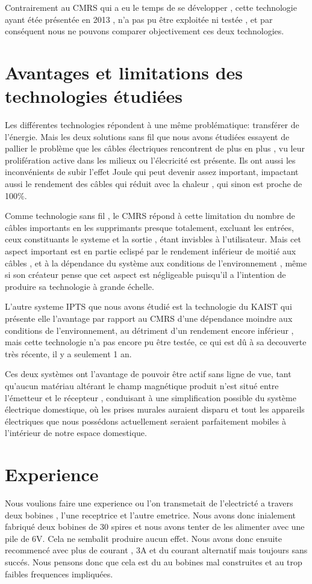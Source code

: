 \documentclass[12pt]{report}
\begin{document}
  Contrairement au CMRS qui a eu le temps de se développer , cette technologie ayant étée présentée en 2013 , n'a pas pu être exploitée ni testée , et par conséquent nous ne pouvons comparer objectivement ces deux technologies.
\section{Avantages et limitations des technologies étudiées}
  Les différentes technologies répondent à une même problématique: transférer de l'énergie. Mais les deux solutions sans fil que nous avons étudiées essayent de pallier le problème que les câbles électriques rencontrent de plus en plus , vu leur prolifération active dans les milieux ou l'élecricité est présente. Ils ont aussi les inconvénients de subir l'effet Joule qui peut devenir assez important, impactant aussi le rendement des câbles qui réduit avec la chaleur , qui sinon est proche de 100\%.

  Comme technologie sans fil , le CMRS répond à cette limitation du nombre de câbles importants en les supprimants presque totalement, excluant les entrées, ceux constituants le systeme et la sortie , étant invisbles à l'utilisateur. Mais cet aspect important est en partie eclispé par le rendement inférieur de moitié aux câbles , et à la dépendance du système aux conditions de l'environnement , même si son créateur pense que cet aspect est négligeable puisqu'il a l'intention de produire sa technologie à grande échelle.
  
  L'autre systeme IPTS que nous avons étudié est la technologie du KAIST qui présente elle l'avantage par rapport au CMRS d'une dépendance moindre aux conditions de l'environnement, au détriment d'un rendement encore inférieur , mais cette technologie n'a pas encore pu être testée, ce qui est dû à sa decouverte très récente, il y a seulement 1 an.
  
  Ces deux systèmes ont l'avantage de pouvoir être actif sans ligne de vue, tant qu'aucun matériau altérant le champ magnétique produit n'est situé entre l'émetteur et le récepteur , conduisant à une simplification possible du système électrique domestique, où les prises murales auraient disparu et tout les appareils électriques que nous possédons actuellement seraient parfaitement mobiles à l'intérieur de notre espace domestique.
  
\section{Experience}
Nous voulions faire une experience ou l'on transmetait de l'electricté a travers deux bobines , l'une receptrice et l'autre emetrice. Nous avons donc inialement fabriqué deux bobines de 30 spires et nous avons tenter de les alimenter avec une pile de 6V. Cela ne sembalit produire aucun effet. Nous avons donc ensuite recommencé avec plus de courant , 3A et du courant alternatif mais toujours sans succés. Nous pensons donc que cela est du au bobines mal construites et au trop faibles frequences impliquées. 
  
\end{document}
